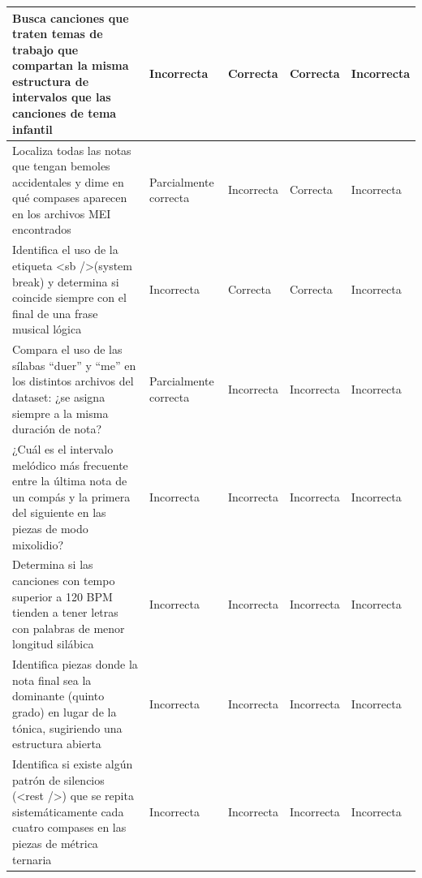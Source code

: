 \begin{longtable}{|m{5cm}|m{2.5cm}|m{2.5cm}|m{2.5cm}|m{2.5cm}|}
\hline

Busca canciones que traten temas de trabajo que compartan la misma estructura de intervalos que las canciones de tema infantil &
Incorrecta &
Correcta &
Correcta &
Incorrecta \\

\hline

Localiza todas las notas que tengan bemoles accidentales y dime en qué compases aparecen en los archivos MEI encontrados &
Parcialmente correcta &
Incorrecta &
Correcta &
Incorrecta \\

\hline

Identifica el uso de la etiqueta <sb />(system break) y determina si coincide siempre con el final de una frase musical lógica &
Incorrecta &
Correcta &
Correcta &
Incorrecta \\

\hline

Compara el uso de las sílabas ``duer'' y ``me'' en los distintos archivos del dataset: ¿se asigna siempre a la misma duración de nota? &
Parcialmente correcta &
Incorrecta &
Incorrecta &
Incorrecta \\

\hline

¿Cuál es el intervalo melódico más frecuente entre la última nota de un compás y la primera del siguiente en las piezas de modo mixolidio? &
Incorrecta &
Incorrecta &
Incorrecta &
Incorrecta \\

\hline

Determina si las canciones con tempo superior a 120 BPM tienden a tener letras con palabras de menor longitud silábica &
Incorrecta &
Incorrecta &
Incorrecta &
Incorrecta \\

\hline

Identifica piezas donde la nota final sea la dominante (quinto grado) en lugar de la tónica, sugiriendo una estructura abierta &
Incorrecta &
Incorrecta &
Incorrecta &
Incorrecta \\

\hline

Identifica si existe algún patrón de silencios (<rest />) que se repita sistemáticamente cada cuatro compases en las piezas de métrica ternaria &
Incorrecta &
Incorrecta &
Incorrecta &
Incorrecta \\

\hline



\end{longtable}

